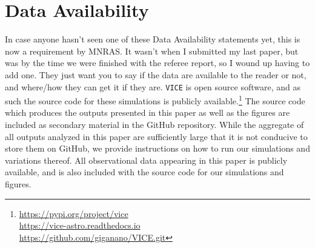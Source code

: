 \documentclass[fleqn, usenatbib]{mnras}
\begin{document}
\section{Data Availability} 
{\color{red} In case anyone hasn't seen one of these Data Availability 
statements yet, this is now a requirement by MNRAS. It wasn't when I submitted 
my last paper, but was by the time we were finished with the referee report, 
so I wound up having to add one. They just want you to say if the data are 
available to the reader or not, and where/how they can get it if they are. }
\texttt{VICE} is open source software, and as such the source code for these 
simulations is publicly available.\footnote{
	\url{https://pypi.org/project/vice} \\ 
	\url{https://vice-astro.readthedocs.io} \\ 
	\url{https://github.com/giganano/VICE.git} 
} The source code which produces the outputs presented in this paper as well as 
the figures are included as secondary material in the GitHub repository. 
While the aggregate of all outputs analyzed in this paper are sufficiently 
large that it is not conducive to store them on GitHub, we provide instructions 
on how to run our simulations and variations thereof. All observational data 
appearing in this paper is publicly available, and is also included with the 
source code for our simulations and figures. 
\end{document}
